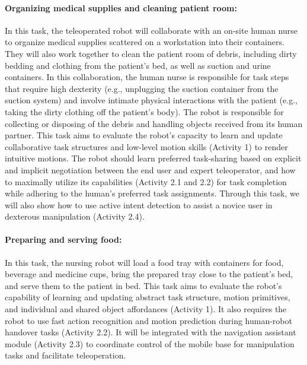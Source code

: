 \documentclass[letterpaper, 11 pt, onecolumn]{article}
\begin{document}
\paragraph*{Organizing medical supplies and cleaning patient room:} In this task, the teleoperated robot will collaborate with an on-site human nurse to organize medical supplies scattered on a workstation into their containers. They will also work together to clean the patient room of debris, including dirty bedding and clothing from the patient's bed, as well as suction and urine containers. In this collaboration, the human nurse is responsible for task steps that require high dexterity (e.g., unplugging the suction container from the suction system) and involve intimate physical interactions with the patient (e.g., taking the dirty clothing off the patient's body). The robot is responsible for collecting or disposing of the debris and handling objects received from its human partner. This task aims to evaluate the robot's capacity to learn and update collaborative task structures and low-level motion skills (Activity 1) to render intuitive motions. The robot should learn preferred task-sharing based on explicit and implicit negotiation between the end user and expert teleoperator, and how to maximally utilize its capabilities (Activity 2.1 and 2.2) for task completion while adhering to the human's preferred task assignments. Through this task, we will also show how to use active intent detection to assist a novice user in dexterous manipulation (Activity 2.4).  %

\paragraph*{Preparing and serving food:} In this task, the nursing robot will load a food tray with containers for food, beverage and medicine cups, bring the prepared tray close to the patient's bed, and serve them to the patient in bed. This task aims to evaluate the robot's capability of learning and updating abstract task structure, motion primitives, and individual and shared object affordances (Activity 1). It also requires the robot to use fast action recognition and motion prediction during human-robot handover tasks (Activity 2.2). 
It will be integrated with the navigation assistant module (Activity 2.3) to coordinate control of the mobile base for manipulation tasks and facilitate teleoperation.


\end{document}
